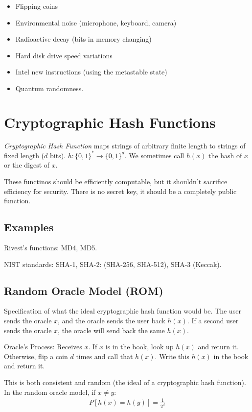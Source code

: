 \documentclass[psamsfonts]{amsart}
\begin{document}
\begin{itemize}
\item Flipping coins
\item Environmental noise (microphone, keyboard, camera)
\item Radioactive decay (bits in memory changing)
\item Hard disk drive speed variations
\item Intel new instructions (using the metastable state)
\item Quantum randomness.
\end{itemize}

\section{Cryptographic Hash Functions}

\emph{Cryptographic Hash Function} maps strings of arbitrary finite length to strings of fixed length ($d$ bits). $h: \{0, 1 \}^* \rightarrow \{0,1\}^d$. We sometimes call $h(x)$ the hash of $x$ or the digest of $x$.

These functinos should be efficiently computable, but it shouldn't sacrifice efficiency for security. There is no secret key, it should be a completely public function.

\subsection{Examples}

Rivest's functions: MD4, MD5. 

NIST standards: SHA-1, SHA-2: (SHA-256, SHA-512), SHA-3 (Keccak). 

\subsection{Random Oracle Model (ROM)}

Specification of what the ideal cryptographic hash function would be. The user sends the oracle $x$, and the oracle sends the user back $h(x)$. If a second user sends the oracle $x$, the oracle will send back the same $h(x)$. 

Oracle's Process: Receives $x$. If $x$ is in the book, look up $h(x)$ and return it. Otherwise, flip a coin $d$ times and call that $h(x)$. Write this $h(x)$ in the book and return it.

This is both consistent and random (the ideal of a cryptographic hash function). In the random oracle model, if $x \neq y$:
\begin{eqnarray}
P[h(x) = h(y)] = \frac{1}{2^d} 
\end{eqnarray}
\end{document}
